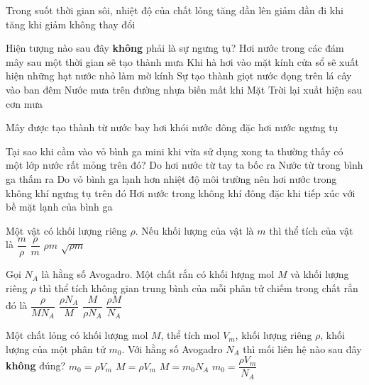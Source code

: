 \begin{ex}
	Trong suốt thời gian sôi, nhiệt độ của chất lỏng
	\choice
	{tăng dần lên}
	{giảm dần đi}
	{khi tăng khi giảm}
	{\True không thay đổi}
	\loigiai{}
\end{ex}

\begin{ex}
	Hiện tượng nào sau đây \textbf{không} phải là sự ngưng tụ?
	\choice
	{Hơi nước trong các đám mây sau một thời gian sẽ tạo thành mưa}
	{Khi hà hơi vào mặt kính cửa sổ sẽ xuất hiện những hạt nước nhỏ làm mờ kính}
	{Sự tạo thành giọt nước đọng trên lá cây vào ban đêm}
	{\True Nước mưa trên đường nhựa biến mất khi Mặt Trời lại xuất hiện sau cơn mưa}
	\loigiai{}
\end{ex}

\begin{ex}
	Mây được tạo thành từ
	\choice
	{nước bay hơi}
	{khói}
	{nước đông đặc}
	{\True hơi nước ngưng tụ}
	\loigiai{}
\end{ex}

\begin{ex}
	Tại sao khi cầm vào vỏ bình ga mini khi vừa sử dụng xong ta thường thấy có một lớp nước rất mỏng trên đó?
	\choice
	{Do hơi nước từ tay ta bốc ra}
	{Nước từ trong bình ga thấm ra}
	{\True Do vỏ bình ga lạnh hơn nhiệt độ môi trường nên hơi nước trong không khí ngưng tụ trên đó}
	{Hơi nước trong không khí đông đặc khi tiếp xúc với bề mặt lạnh của bình ga}
	\loigiai{}
\end{ex}

\begin{ex}
	Một vật có khối lượng riêng $\rho$. Nếu khối lượng của vật là $m$ thì thể tích của vật là
	\choice
	{\True $\dfrac{m}{\rho}$}
	{$\dfrac{\rho}{m}$}
	{$\rho m$}
	{$\sqrt{\rho m}$}
	\loigiai{}
\end{ex}

\begin{ex}
	Gọi $N_A$ là hằng số Avogadro. Một chất rắn có khối lượng mol $M$ và khối lượng riêng $\rho$ thì thể tích không gian trung bình của mỗi phân tử chiếm trong chất rắn đó là
	\choice
	{$\dfrac{\rho}{MN_A}$}
	{$\dfrac{\rho N_A}{M}$}
	{\True $\dfrac{M}{\rho N_A}$}
	{$\dfrac{\rho M}{N_A}$}
	\loigiai{}
\end{ex}

\begin{ex}
	Một chất lỏng có khối lượng mol $M$, thể tích mol $V_m$, khối lượng riêng $\rho$, khối lượng của một phân tử $m_0$. Với hằng số Avogadro $N_A$ thì mối liên hệ nào sau đây \textbf{không} đúng?
	\choice
	{$m_0=\rho V_m$}
	{$M=\rho V_m$}
	{$M=m_0N_A$}
	{\True $m_0=\dfrac{\rho V_m}{N_A}$}
	\loigiai{}
\end{ex}

